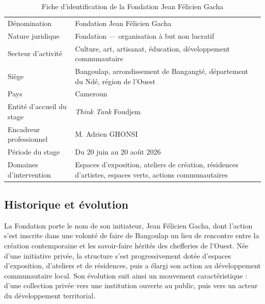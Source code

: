 \begin{table}[htbp]
\centering
\caption{Fiche d'identification de la Fondation Jean Félicien Gacha}
\label{tab:fiche}
\small
\begin{tabularx}{\textwidth}{|L{5.2cm}|X|}
\hline
{}
 &  \\ \hline
Dénomination & Fondation Jean Félicien Gacha \\ \hline
Nature juridique & Fondation — organisation à but non lucratif \\ \hline
Secteur d'activité & Culture, art, artisanat, éducation, développement communautaire \\ \hline
Siège & Bangoulap, arrondissement de Bangangté, département du Ndé, région de l'Ouest \\ \hline
Pays & Cameroun \\ \hline
Entité d'accueil du stage & \emph{Think Tank} Foudjem \\ \hline
Encadreur professionnel & M. Adrien GHONSI \\ \hline
Période du stage & Du 20 juin au 20 août 2026 \\ \hline
Domaines d'intervention & Espaces d'exposition, ateliers de création, résidences d'artistes, espaces verts, actions communautaires \\ \hline
\end{tabularx}
\end{table}


\subsection{Historique et évolution}

La Fondation porte le nom de son initiateur, Jean Félicien Gacha, dont l'action
s'est inscrite dans une volonté de faire de Bangoulap un lieu de rencontre entre
la création contemporaine et les savoir-faire hérités des chefferies de l'Ouest.
Née d'une initiative privée, la structure s'est progressivement dotée d'espaces
d'exposition, d'ateliers et de résidences, puis a élargi son action au
développement communautaire local. Son évolution suit ainsi un mouvement
caractéristique : d'une collection privée vers une institution ouverte au
public, puis vers un acteur du développement territorial.


